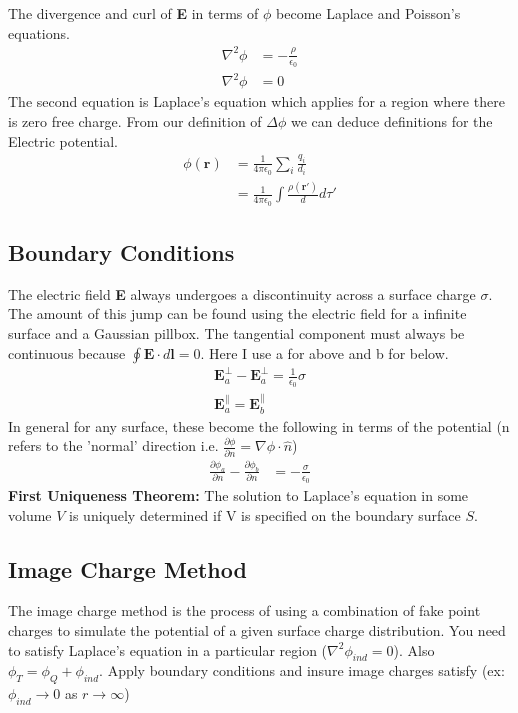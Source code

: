 \documentclass[a4paper, 11pt]{article}
\begin{document}
		The divergence and curl of \textbf{E} in terms of $\phi$ become Laplace and Poisson's equations. 
			\begin{align}
				\nabla^2\phi &= -\frac{\rho}{\epsilon_0} \\
				\nabla^2\phi &= 0 
			\end{align}
		The second equation is Laplace's equation which applies for a region where there is zero free charge. From our definition of $\Delta \phi$ we can deduce definitions for the Electric potential. 
			\begin{align}
				\phi(\mathbf{r}) 	&= \frac{1}{4 \pi \epsilon_0} \sum\limits_i \frac{q_i}{d_i} \\
									&= \frac{1}{4\pi\epsilon_0} \int \frac{\rho(\mathbf{r'})}{d} d\tau' 
			\end{align}
	\subsection*{Boundary Conditions}
		The electric field \textbf{E} always undergoes a discontinuity across a surface charge $\sigma$. The amount of this jump can be found using the electric field for a infinite surface and a Gaussian pillbox. The tangential component must always be continuous because $\oint \mathbf{E} \cdot d\mathbf{l} = 0$. Here I use a for above and b for below. 
			\begin{align}
				\mathbf{E}_{a}^{\bot} -\mathbf{E}_{a}^{\bot} = \frac{1}{\epsilon_0}{\sigma} \\ 
				\mathbf{E}_{a}^{\parallel} = \mathbf{E}_{b}^{\parallel} 
			\end{align}
		In general for any surface, these become the following in terms of the potential (n refers to the 'normal' direction i.e. $\frac{\partial \phi}{\partial n} = \nabla \phi \cdot \hat{n}$)
			\begin{align}
				\frac{\partial \phi_a}{\partial n} - \frac{\partial \phi_b}{\partial n} &= - \frac{\sigma}{\epsilon_0}
			\end{align}
		\textbf{First Uniqueness Theorem:} The solution to Laplace's equation in some volume $V$ is uniquely determined if V is specified on the boundary surface $S$. 
	\subsection*{Image Charge Method} 
		The image charge method is the process of using a combination of fake point charges to simulate the potential of a given surface charge distribution. You need to satisfy Laplace's equation in a particular region ($\nabla^2\phi_{ind} = 0$). Also $\phi_T = \phi_Q + \phi_{ind}$. Apply boundary conditions and insure image charges satisfy (ex: $\phi_{ind} \rightarrow 0$ as $r \rightarrow \infty $)
\end{document}

